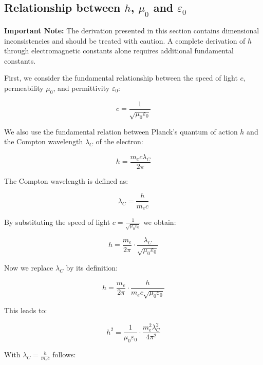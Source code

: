 \documentclass[12pt,a4paper]{article}
\begin{document}
	\subsection{Relationship between $h$, $\mu_0$ and $\varepsilon_0$}
	
	\textbf{Important Note:} The derivation presented in this section contains dimensional inconsistencies and should be treated with caution. A complete derivation of $h$ through electromagnetic constants alone requires additional fundamental constants.
	
	First, we consider the fundamental relationship between the speed of light $c$, permeability $\mu_0$, and permittivity $\varepsilon_0$:
	
	\begin{equation}
		c = \frac{1}{\sqrt{\mu_0\varepsilon_0}}
	\end{equation}
	
	We also use the fundamental relation between Planck's quantum of action $h$ and the Compton wavelength $\lambda_C$ of the electron:
	
	\begin{equation}
		h = \frac{m_e c \lambda_C}{2\pi}
	\end{equation}
	
	The Compton wavelength is defined as:
	
	\begin{equation}
		\lambda_C = \frac{h}{m_e c}
	\end{equation}
	
	By substituting the speed of light $c = \frac{1}{\sqrt{\mu_0\varepsilon_0}}$ we obtain:
	
	\begin{equation}
		h = \frac{m_e}{2\pi} \cdot \frac{\lambda_C}{\sqrt{\mu_0\varepsilon_0}}
	\end{equation}
	
	Now we replace $\lambda_C$ by its definition:
	
	\begin{equation}
		h = \frac{m_e}{2\pi} \cdot \frac{h}{m_e c \sqrt{\mu_0\varepsilon_0}}
	\end{equation}
	
	This leads to:
	
	\begin{equation}
		h^2 = \frac{1}{\mu_0\varepsilon_0} \cdot \frac{m_e^2 \lambda_C^2}{4\pi^2}
	\end{equation}
	
	With $\lambda_C = \frac{h}{m_e c}$ follows:
	
\end{document}
